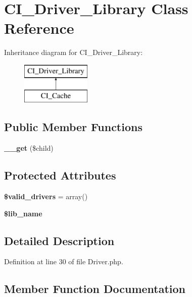 \section{C\-I\-\_\-\-Driver\-\_\-\-Library Class Reference}
\label{class_c_i___driver___library}
Inheritance diagram for C\-I\-\_\-\-Driver\-\_\-\-Library\-:\begin{figure}[H]
\begin{center}
\leavevmode
\includegraphics[height=2.000000cm]{class_c_i___driver___library}
\end{center}
\end{figure}
\subsection*{Public Member Functions}
\begin{DoxyCompactItemize}
\item 
{\bf \-\_\-\-\_\-get} (\$child)
\end{DoxyCompactItemize}
\subsection*{Protected Attributes}
\begin{DoxyCompactItemize}
\item 
{\bf \$valid\-\_\-drivers} = array()
\item 
{\bf \$lib\-\_\-name}
\end{DoxyCompactItemize}


\subsection{Detailed Description}


Definition at line 30 of file Driver.\-php.



\subsection{Member Function Documentation}

